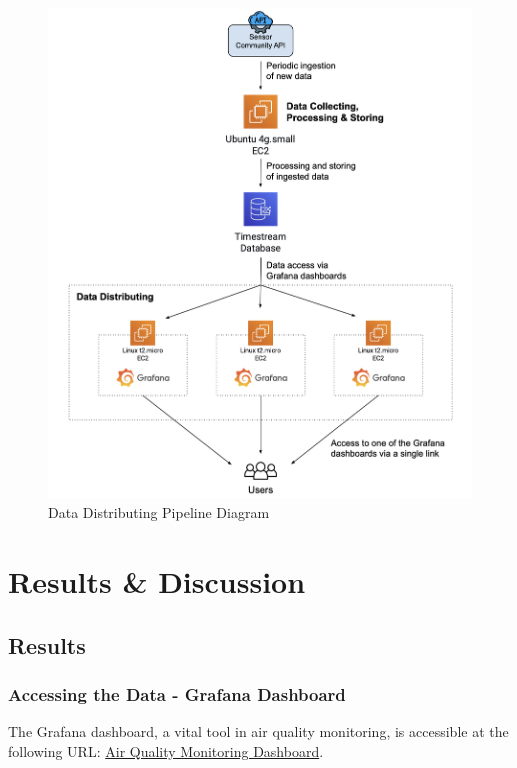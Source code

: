 \documentclass[12pt,oneside]{book} %
\begin{document}
\begin{figure}[H]
    \centering
    \includegraphics[width=1\linewidth]{images/pipeline.png}
    \caption{Data Distributing Pipeline Diagram}
\end{figure}

\newpage
\chapter{Results \& Discussion}

\section{Results}
\subsection{Accessing the Data - Grafana Dashboard}

The Grafana dashboard, a vital tool in air quality monitoring, is accessible at
the following URL:
\href{http://grafana-1777174802.us-east-1.elb.amazonaws.com/d/f8742187-f440-4ee8-96cc-bad5af8edef1/air-quality-monitoring}{Air
    Quality Monitoring Dashboard}.
\end{document}
